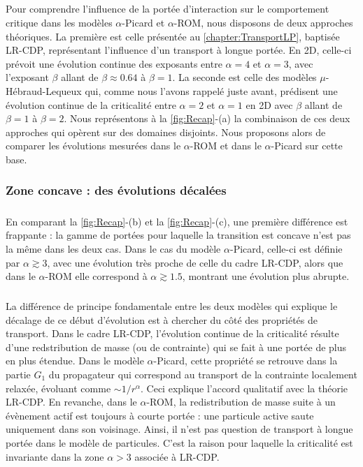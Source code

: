 \subparagraph{}Pour comprendre l'influence de la portée d'interaction sur le comportement critique dans les modèles $\alpha$-Picard et $\alpha$-ROM, nous disposons de deux approches théoriques. La première est celle présentée au \autoref{chapter:TransportLP}, baptisée LR-CDP, représentant l'influence d'un transport à longue portée. En 2D, celle-ci prévoit une évolution continue des exposants entre $\alpha = 4$ et $\alpha = 3$, avec l'exposant $\beta$ allant de $\beta \approx 0.64$ à $\beta = 1$. La seconde est celle des modèles $\mu$-Hébraud-Lequeux qui, comme nous l'avons rappelé juste avant, prédisent une évolution continue de la criticalité entre $\alpha=2$ et $\alpha = 1$ en 2D avec $\beta$ allant de $\beta = 1$ à $\beta = 2$. Nous représentons à la \autoref{fig:Recap}-(a) la combinaison de ces deux approches qui opèrent sur des domaines disjoints. Nous proposons alors de comparer les évolutions mesurées dans le $\alpha$-ROM et dans le $\alpha$-Picard sur cette base.

\subsubsection{Zone concave : des évolutions décalées}

\subparagraph{}En comparant la \autoref{fig:Recap}-(b) et la \autoref{fig:Recap}-(c), une première différence est frappante : la gamme de portées pour laquelle la transition est concave n'est pas la même dans les deux cas. Dans le cas du modèle $\alpha$-Picard, celle-ci est définie par $\alpha \gtrsim 3$, avec une évolution très proche de celle du cadre LR-CDP, alors que dans le $\alpha$-ROM elle correspond à $\alpha \gtrsim 1.5$, montrant une évolution plus abrupte.

\subparagraph{}La différence de principe fondamentale entre les deux modèles qui explique le décalage de ce début d'évolution est à chercher du côté des propriétés de transport. Dans le cadre LR-CDP, l'évolution continue de la criticalité résulte d'une redstribution de masse (ou de contrainte) qui se fait à une portée de plus en plus étendue. Dans le modèle $\alpha$-Picard, cette propriété se retrouve dans la partie $G_1$ du propagateur qui correspond au transport de la contrainte localement relaxée, évoluant comme $\sim 1/r^\alpha$. Ceci explique l'accord qualitatif avec la théorie LR-CDP. En revanche, dans le $\alpha$-ROM, la redistribution de masse suite à un évènement actif est toujours à courte portée : une particule active saute uniquement dans son voisinage. Ainsi, il n'est pas question de transport à longue portée dans le modèle de particules. C'est la raison pour laquelle la criticalité est invariante dans la zone $\alpha > 3$ associée à LR-CDP.

